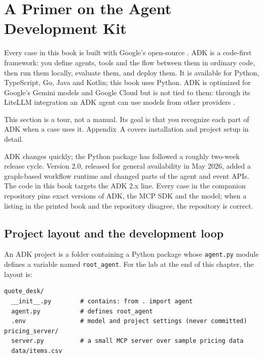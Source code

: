 
\section{A Primer on the Agent Development Kit}
\label{sec:adk}

Every case in this book is built with Google's open-source . ADK is a code-first framework: you define agents, tools and the flow between them in ordinary code, then run them locally, evaluate them, and deploy them. It is available for Python, TypeScript, Go, Java and Kotlin; this book uses Python. ADK is optimized for Google's Gemini models and Google Cloud but is not tied to them: through its LiteLLM integration an ADK agent can use models from other providers \citep{adkdocs}.

This section is a tour, not a manual. Its goal is that you recognize each part of ADK when a case uses it. Appendix~A covers installation and project setup in detail.

\begin{versionnote}
ADK changes quickly; the Python package has followed a roughly two-week release cycle. Version 2.0, released for general availability in May 2026, added a graph-based workflow runtime and changed parts of the agent and event APIs. The code in this book targets the ADK 2.x line. Every case in the companion repository pins exact versions of ADK, the MCP SDK and the model; when a listing in the printed book and the repository disagree, the repository is correct.
\end{versionnote}

\subsection{Project layout and the development loop}

An ADK project is a folder containing a Python package whose \texttt{agent.py} module defines a variable named \texttt{root\_agent}. For the lab at the end of this chapter, the layout is:

\begin{lstlisting}[language={},caption={Layout of the Chapter 1 lab project.},label={lst:layout}]
quote_desk/
  __init__.py        # contains: from . import agent
  agent.py           # defines root_agent
  .env               # model and project settings (never committed)
pricing_server/
  server.py          # a small MCP server over sample pricing data
  data/items.csv
\end{lstlisting}

